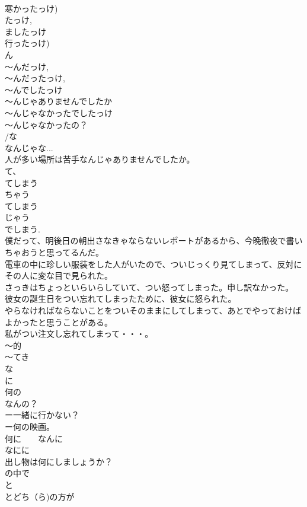 \documentclass[8pt]{extreport}
\begin{document}
\begin{CJK}{UTF8}{min}
\\	寒かったっけ)
\\	たっけ, 
\\	ましたっけ　　
\\	行ったっけ)
\\	ん 
\\	～んだっけ, 
\\	～んだったっけ, 
\\	～んでしたっけ
\\	～んじゃありませんでしたか
\\	～んじゃなかったでしたっけ
\\	～んじゃなかったの？
\\	/な
\\	なんじゃな...
\\	人が多い場所は苦手なんじゃありませんでしたか。
\\	て、
\\	てしまう
\\	ちゃう 
\\	てしまう 
\\	じゃう 
\\	でしまう.
\\	僕だって、明後日の朝出さなきゃならないレポートがあるから、今晩徹夜で書いちゃおうと思ってるんだ。
\\	電車の中に珍しい服装をした人がいたので、ついじっくり見てしまって、反対にその人に変な目で見られた。
\\	さっきはちょっといらいらしていて、つい怒ってしまった。申し訳なかった。
\\	彼女の誕生日をつい忘れてしまったために、彼女に怒られた。
\\	やらなければならないことをついそのままにしてしまって、あとでやっておけばよかったと思うことがある。
\\	私がつい注文し忘れてしまって・・・。	
\\	～的
\\	～てき
\\	な 
\\	に
\\	何の
\\	なんの？
\\	ー一緒に行かない？
\\	ー何の映画。
\\	何に　　なんに
\\	なにに
\\	出し物は何にしましょうか？	
\\	の中で
\\	と
\\	とどち（ら)の方が

\end{CJK}
\end{document}
